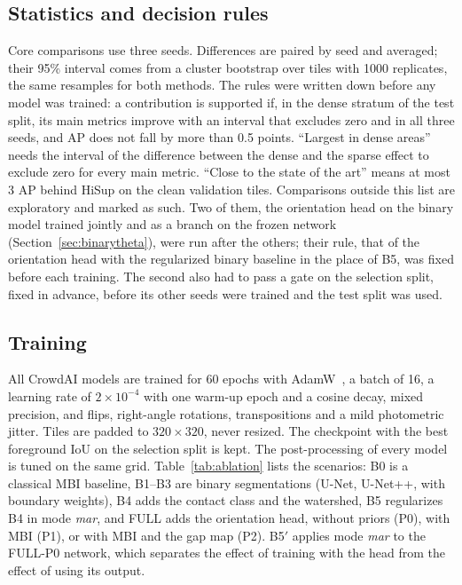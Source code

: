 \documentclass[conference]{IEEEtran}
\begin{document}
\subsection{Statistics and decision rules}
Core comparisons use three seeds. Differences are paired by seed and averaged; their 95\% interval comes from a cluster
bootstrap over tiles with 1000 replicates, the same resamples for both methods. The rules were written down before any
model was trained: a contribution is supported if, in the dense stratum of the test split, its main metrics improve
with an interval that excludes zero and in all three seeds, and AP does not fall by more than 0.5 points. ``Largest in
dense areas'' needs the interval of the difference between the dense and the sparse effect to exclude zero for every
main metric. ``Close to the state of the art'' means at most 3 AP behind HiSup on the clean validation tiles.
Comparisons outside this list are exploratory and marked as such. Two of them, the orientation head on the binary
model trained jointly and as a branch on the frozen network (Section~\ref{sec:binarytheta}), were run after the
others; their rule, that of the orientation head with the regularized binary baseline in the place of B5, was fixed
before each training. The second also had to pass a gate on the selection split, fixed in advance, before its other
seeds were trained and the test split was used.

\subsection{Training}
All CrowdAI models are trained for 60 epochs with AdamW~\cite{loshchilov2019adamw}, a batch of 16, a learning rate of
$2\times10^{-4}$ with one warm-up epoch and a cosine decay, mixed precision, and flips, right-angle rotations,
transpositions and a mild photometric jitter. Tiles are padded to $320\times320$, never resized. The checkpoint with the
best foreground IoU on the selection split is kept. The post-processing of every model is tuned on the same grid.
Table~\ref{tab:ablation} lists the scenarios: B0 is a classical MBI baseline, B1--B3 are binary segmentations (U-Net,
U-Net++, with boundary weights), B4 adds the contact class and the watershed, B5 regularizes B4 in mode \emph{mar}, and
FULL adds the orientation head, without priors (P0), with MBI (P1), or with MBI and the gap map (P2).
B5$'$ applies mode \emph{mar} to the FULL-P0 network, which separates the effect of training with the head from the
effect of using its output.
\end{document}
